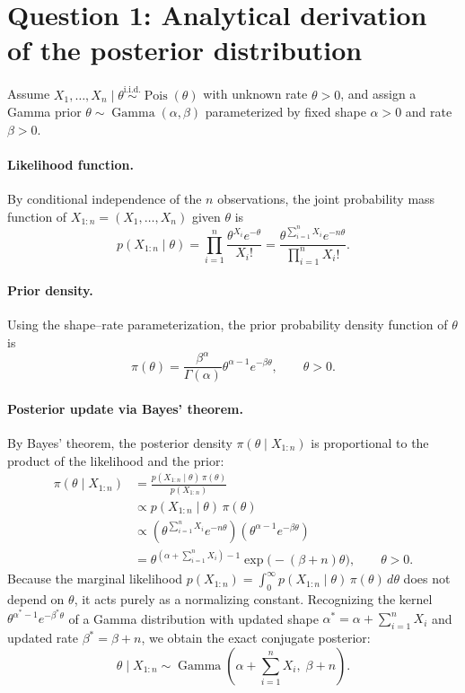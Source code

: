 \section*{Question 1: Analytical derivation of the posterior distribution}

Assume $X_1, \dots, X_n \mid \theta \stackrel{\text{i.i.d.}}{\sim} \operatorname{Pois}(\theta)$ with unknown rate $\theta > 0$, and assign a Gamma prior $\theta \sim \operatorname{Gamma}(\alpha, \beta)$ parameterized by fixed shape $\alpha > 0$ and rate $\beta > 0$.

\paragraph{Likelihood function.}
By conditional independence of the $n$ observations, the joint probability mass function of $X_{1:n} = (X_1, \dots, X_n)$ given $\theta$ is
\[
p(X_{1:n} \mid \theta)
= \prod_{i=1}^{n} \frac{\theta^{X_i} e^{-\theta}}{X_i!}
= \frac{\theta^{\sum_{i=1}^{n} X_i} e^{-n\theta}}{\prod_{i=1}^{n} X_i!}.
\]

\paragraph{Prior density.}
Using the shape--rate parameterization, the prior probability density function of $\theta$ is
\[
\pi(\theta)
= \frac{\beta^\alpha}{\Gamma(\alpha)} \theta^{\alpha - 1} e^{-\beta\theta},
\qquad \theta > 0.
\]

\paragraph{Posterior update via Bayes' theorem.}
By Bayes' theorem, the posterior density $\pi(\theta \mid X_{1:n})$ is proportional to the product of the likelihood and the prior:
\begin{align*}
\pi(\theta \mid X_{1:n})
&= \frac{p(X_{1:n} \mid \theta)\,\pi(\theta)}{p(X_{1:n})} \\
&\propto p(X_{1:n} \mid \theta)\,\pi(\theta) \\
&\propto \left(\theta^{\sum_{i=1}^{n} X_i} e^{-n\theta}\right)
         \left(\theta^{\alpha - 1} e^{-\beta\theta}\right) \\
&= \theta^{\left(\alpha + \sum_{i=1}^{n} X_i\right) - 1}
   \exp\!\bigl(-(\beta + n)\theta\bigr), \qquad \theta > 0.
\end{align*}
Because the marginal likelihood $p(X_{1:n}) = \int_0^\infty p(X_{1:n} \mid \theta)\,\pi(\theta)\,d\theta$ does not depend on $\theta$, it acts purely as a normalizing constant. Recognizing the kernel $\theta^{\alpha^* - 1} e^{-\beta^* \theta}$ of a Gamma distribution with updated shape $\alpha^* = \alpha + \sum_{i=1}^{n} X_i$ and updated rate $\beta^* = \beta + n$, we obtain the exact conjugate posterior:
\[
\boxed{\theta \mid X_{1:n} \sim \operatorname{Gamma}\!\left(\alpha + \sum_{i=1}^{n} X_i,\; \beta + n\right).}
\]

